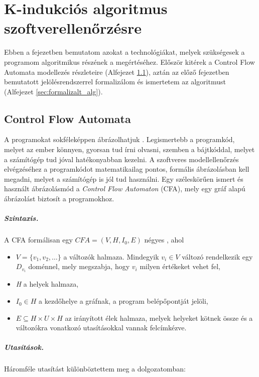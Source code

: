 \chapter{K-indukciós algoritmus szoftverellenőrzésre}

Ebben a fejezetben bemutatom azokat a technológiákat, melyek szükségesek a programom algoritmikus részének a megértéséhez. Először kitérek a Control Flow Automata modellezés részleteire (Alfejezet \ref{sec:control_flow_automata}), aztán az előző fejezetben bemutatott jelölésrendszerrel formalizálom és ismertetem az algoritmust (Alfejezet \ref{sec:formalizalt_alg}).

\section{Control Flow Automata}
\label{sec:control_flow_automata}

A programokat sokféleképpen ábrázolhatjuk \cite{soft_ver_akos}. Legismertebb a programkód, melyet az ember könnyen, gyorsan tud írni olvasni, szemben a bájtkóddal, melyet a számítógép tud jóval hatékonyabban kezelni. A szoftveres modellellenőrzés elvégzéséhez a programkódot matematikailag pontos, formális ábrázolásban kell megadni, melyet a számítógép is jól tud használni. Egy széleskörűen ismert és használt ábrázolásmód a \emph{Control Flow Automaton} (CFA), mely egy gráf alapú ábrázolást biztosít a programokhoz. 

\paragraph{Szintaxis.}
A CFA  formálisan egy $\mathit{CFA} = (V, H, I_0, E)$ négyes \cite{beyer13}, ahol

\begin{itemize}
	\item $V = \{v_1, v_2, \ldots\}$ a változók halmaza. Mindegyik $v_i \in V$ változó rendelkezik egy $D_{v_i}$ doménnel, mely megszabja, hogy $v_i$ milyen értékeket vehet fel,
	\item \emph{H} a helyek halmaza,
	\item $I_0 \in H$ a kezdőhelye a gráfnak, a program belépőpontját jelöli,
	\item $E \subseteq H \times U \times H$ az irányított élek halmaza, melyek helyeket kötnek össze és a változókra vonatkozó utasításokkal vannak felcímkézve.
\end{itemize}

\paragraph{Utasítások.}
Háromféle utasítást különböztettem meg a dolgozatomban: 

